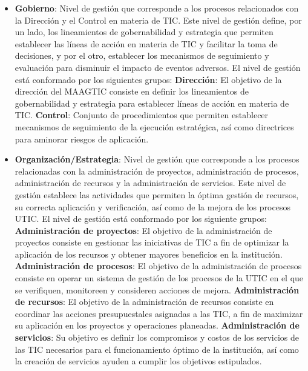 	\begin{itemize}
		\item \textbf{Gobierno}: Nivel de gestión que corresponde a los procesos relacionados con la Dirección y el Control en materia de TIC. Este nivel de gestión define, por un lado, los lineamientos de gobernabilidad y estrategia que permiten establecer las líneas de acción en materia de TIC y facilitar la toma de decisiones, y por el otro, establecer los mecanismos de seguimiento y evaluación para disminuir el impacto de eventos adversos\cite{MAAGTICSIGobierno}. El nivel de gestión está conformado por los siguientes grupos:
			\subitem \textbf{Dirección}: El objetivo de la dirección del MAAGTIC consiste en definir los lineamientos de gobernabilidad y estrategia para establecer líneas de acción en materia de TIC\cite{MAAGTICSIGobierno}.
			\subitem \textbf{Control}: Conjunto de procedimientos que permiten establecer mecanismos de seguimiento de la ejecución estratégica, así como directrices para aminorar riesgos de aplicación\cite{MAAGTICSIGobierno}.
		\item \textbf{Organización/Estrategia}: Nivel de gestión que corresponde a los procesos relacionadas con la administración de proyectos, administración de procesos, administración de recursos y la administración de servicios. Este nivel de gestión establece las actividades que permiten la óptima gestión de recursos, su correcta aplicación y verificación, así como de la mejora de los procesos UTIC\cite{MAAGTICSIOrganizacion}. El nivel de gestión está conformado por los siguiente grupos:
			\subitem \textbf{Administración de proyectos}: El objetivo de la administración de proyectos consiste en gestionar las iniciativas de TIC a fin de optimizar la aplicación de los recursos y obtener mayores beneficios en la institución\cite{MAAGTICSIOrganizacion}.
			\subitem \textbf{Administración de procesos}: El objetivo de la administración de procesos consiste en operar un sistema de gestión de los procesos de la UTIC en el que se verifiquen, monitoreen y consideren acciones de mejora\cite{MAAGTICSIOrganizacion}.
			\subitem \textbf{Administración de recursos}: El objetivo de la administración de recursos consiste en coordinar las acciones presupuestales asignadas a las TIC, a fin de maximizar su aplicación en los proyectos y operaciones planeadas\cite{MAAGTICSIOrganizacion}.
			\subitem \textbf{Administración de servicios}: Su objetivo es definir los compromisos y costos de los servicios de las TIC necesarios para el funcionamiento óptimo de la institución, así como la creación de servicios ayuden a cumplir los objetivos estipulados\cite{MAAGTICSIOrganizacion}.

\end{itemize}
